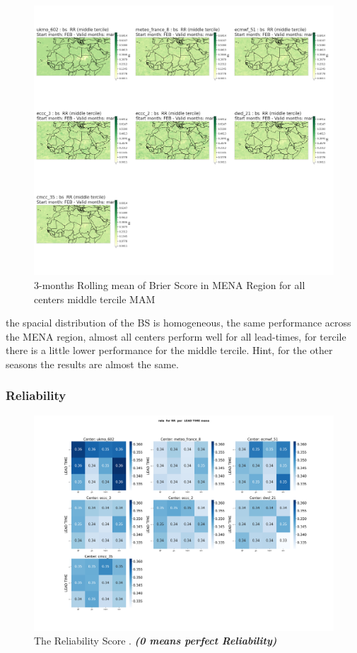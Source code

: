 \begin{figure}[H]
\includegraphics[scale=0.3]{plots/prob/bs/bs_mam_RR_middle.png}
\caption{3-months Rolling mean of Brier Score in MENA Region for all centers middle tercile MAM}
\end{figure}

the spacial distribution of the BS is homogeneous, the same performance across the MENA region, almost all centers perform well for all lead-times, for  tercile there is a little lower performance for the middle tercile.
Hint, for the other seasons the results are almost the same. 


\subsubsection{Reliability}

\begin{figure}[H]
    \centering
    \includegraphics[scale=0.25]{plots/prob/rela/rela_RR_mena.png}
    \caption{The Reliability Score  . \textbf{\textit{(0 means perfect Reliability)}}}
\end{figure}

